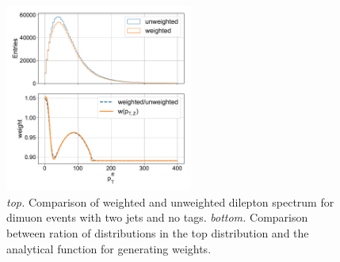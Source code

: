 \begin{figure}[ht]
    \centering
    \includegraphics[width=0.55\textwidth]{chapters/Analysis/sectionDataset/figures/z_pt_weighting}
    \caption{\emph{top.} Comparison of weighted and unweighted dilepton \pt spectrum for dimuon events with two jets and no \PQb tags. \emph{bottom.} Comparison between ration of distributions in the top distribution and the analytical function for generating weights.}
    \label{fig:analysis:dataset:ww_weight}
\end{figure}




